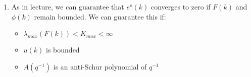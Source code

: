 \begin{enumerate}
    \item
    As in lecture, we can guarantee that $e^o(k)$ converges to zero if $F(k)$ and $\phi(k)$ remain bounded. We can guarantee this if:
    \begin{itemize}
        \item
        $\lambda_{max}(F(k)) < K_{max} < \infty$
        
        \item
        $u(k)$ is bounded
        
        \item
        $A(q^{-1})$ is an anti-Schur polynomial of $q^{-1}$
        
    \end{itemize}
    
    
\end{enumerate} 